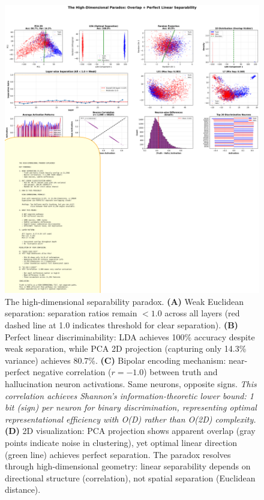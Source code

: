 \documentclass[11pt]{article}
\begin{document}
\begin{figure}[t]
\centering
\includegraphics[width=\textwidth]{figures/high_dimensional_paradox.png}
\caption{The high-dimensional separability paradox. \textbf{(A)} Weak Euclidean separation: separation ratios remain $< 1.0$ across all layers (red dashed line at 1.0 indicates threshold for clear separation). \textbf{(B)} Perfect linear discriminability: LDA achieves 100\% accuracy despite weak separation, while PCA 2D projection (capturing only 14.3\% variance) achieves 80.7\%. \textbf{(C)} Bipolar encoding mechanism: near-perfect negative correlation ($r = -1.0$) between truth and hallucination neuron activations. Same neurons, opposite signs. \textit{This correlation achieves Shannon's information-theoretic lower bound: 1 bit (sign) per neuron for binary discrimination, representing optimal representational efficiency with O(D) rather than O(2D) complexity.} \textbf{(D)} 2D visualization: PCA projection shows apparent overlap (gray points indicate noise in clustering), yet optimal linear direction (green line) achieves perfect separation. The paradox resolves through high-dimensional geometry: linear separability depends on directional structure (correlation), not spatial separation (Euclidean distance).}
\label{fig:highdim-paradox}
\end{figure}
\end{document}
